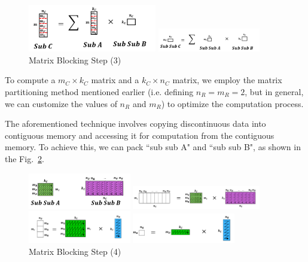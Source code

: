 \documentclass[conference]{IEEEtran}
\begin{document}
	\begin{figure}[htbp]
	\centerline{\includegraphics[width=0.5\textwidth]{fig5.png}}
	\centerline{\includegraphics[width=0.4\textwidth]{fig5-2.png}}
	\caption{Matrix Blocking Step (3)}
	\label{matrixBlockingStep3}
	\end{figure}

	To compute a $m_C \times k_C$ matrix and a $k_C \times n_C$ matrix, we employ the matrix partitioning method mentioned earlier (i.e. defining $n_R = m_R = 2$, but in general, we can customize the values of $n_R$ and $m_R$) to optimize the computation process.
	
	The aforementioned technique involves copying discontinuous data into contiguous memory and accessing it for computation from the contiguous memory. To achieve this, we can pack ``sub sub A" and ``sub sub B", as shown in the Fig.~\ref{matrixBlockingStep4}.
	
	\begin{figure}[htbp]
		\centerline{\includegraphics[width=0.4\textwidth]{fig6-1.png}}
		\centerline{\includegraphics[width=0.5\textwidth]{fig6-2.png}}
		\centerline{\includegraphics[width=0.4\textwidth]{fig6-3.png}}
		\centerline{\includegraphics[width=0.4\textwidth]{fig6-4.png}}
		\caption{Matrix Blocking Step (4)}
		\label{matrixBlockingStep4}
	\end{figure}
\end{document}
